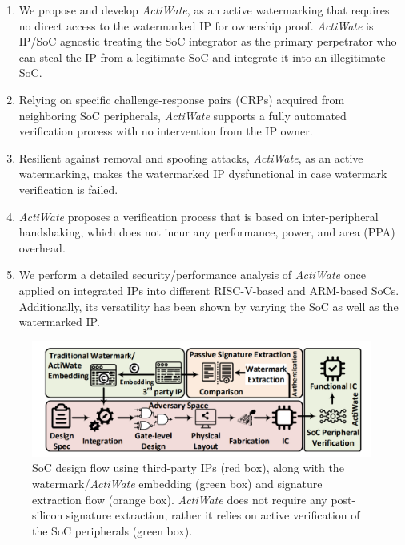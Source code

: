 \documentclass[onecolumn]{IEEEtran}
\begin{document}
\begin{enumerate}
	\item We propose and develop \textit{ActiWate}, as an active watermarking that requires no direct access to the watermarked IP for ownership proof. \textit{ActiWate} is IP/SoC agnostic treating the SoC integrator as the primary perpetrator who can steal the IP from a legitimate SoC and integrate it into an illegitimate SoC.
	
	\item Relying on specific challenge-response pairs (CRPs) acquired from neighboring SoC peripherals, \textit{ActiWate} supports a fully automated verification process with no intervention from the IP owner.
	
	\item Resilient against removal and spoofing attacks, \textit{ActiWate}, as an active watermarking, makes the watermarked IP dysfunctional in case watermark verification is failed.
	
	\item \textit{ActiWate} proposes a verification process that is based on inter-peripheral handshaking, which does not incur any performance, power, and area (PPA) overhead.
	
	\item We perform a detailed security/performance analysis of \textit{ActiWate} once applied on integrated IPs into different RISC-V-based and ARM-based SoCs. Additionally, its versatility has been shown by varying the SoC as well as the watermarked IP.
\end{enumerate}
\begin{figure}[h]
	\centering
	\includegraphics[width=\columnwidth]{fig1.png}
	\caption{SoC design flow using third-party IPs (red box), along with the
		watermark/\textit{ActiWate} embedding (green box) and signature extraction flow
		(orange box). \textit{ActiWate} does not require any post-silicon signature extraction,
		rather it relies on active verification of the SoC peripherals (green box).}
	\label{fig1}
\end{figure}
\end{document}
